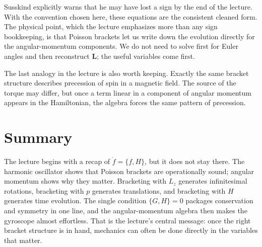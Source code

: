 Susskind explicitly warns that he may have lost a sign by the end of the lecture. With the convention chosen here, these equations are the consistent cleaned form. The physical point, which the lecture emphasizes more than any sign bookkeeping, is that Poisson brackets let us write down the evolution directly for the angular-momentum components. We do not need to solve first for Euler angles and then reconstruct \(\mathbf L\); the useful variables come first.

The last analogy in the lecture is also worth keeping. Exactly the same bracket structure describes precession of spin in a magnetic field. The source of the torque may differ, but once a term linear in a component of angular momentum appears in the Hamiltonian, the algebra forces the same pattern of precession.

\section{Summary}

The lecture begins with a recap of \(\dot f=\{f,H\}\), but it does not stay there. The harmonic oscillator shows that Poisson brackets are operationally sound; angular momentum shows why they matter. Bracketing with \(L_z\) generates infinitesimal rotations, bracketing with \(p\) generates translations, and bracketing with \(H\) generates time evolution. The single condition \(\{G,H\}=0\) packages conservation and symmetry in one line, and the angular-momentum algebra then makes the gyroscope almost effortless. That is the lecture's central message: once the right bracket structure is in hand, mechanics can often be done directly in the variables that matter.